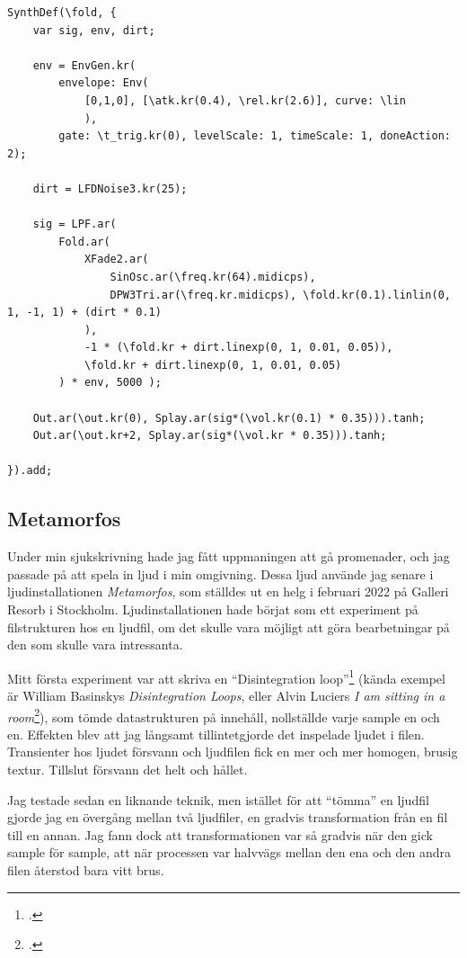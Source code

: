 \documentclass{article}
\renewcommand{\baselinestretch}{1.5}
\begin{document}
\pagebreak
\renewcommand{\baselinestretch}{1}
\begin{lstlisting}[style=SuperCollider-IDE, caption=Fold-SynthDef från K87-89]
SynthDef(\fold, {
	var sig, env, dirt;

	env = EnvGen.kr(
		envelope: Env(
			[0,1,0], [\atk.kr(0.4), \rel.kr(2.6)], curve: \lin
			), 
		gate: \t_trig.kr(0), levelScale: 1, timeScale: 1, doneAction: 2);

	dirt = LFDNoise3.kr(25);

	sig = LPF.ar( 
		Fold.ar(
			XFade2.ar(
				SinOsc.ar(\freq.kr(64).midicps), 
				DPW3Tri.ar(\freq.kr.midicps), \fold.kr(0.1).linlin(0, 1, -1, 1) + (dirt * 0.1)
			),
			-1 * (\fold.kr + dirt.linexp(0, 1, 0.01, 0.05)),
			\fold.kr + dirt.linexp(0, 1, 0.01, 0.05)
		) * env, 5000 );

	Out.ar(\out.kr(0), Splay.ar(sig*(\vol.kr(0.1) * 0.35))).tanh;
	Out.ar(\out.kr+2, Splay.ar(sig*(\vol.kr * 0.35))).tanh;

}).add;
\end{lstlisting}
\renewcommand{\baselinestretch}{1.5}

\subsection{Metamorfos}
Under min sjukskrivning hade jag fått uppmaningen att gå promenader, och jag passade på att spela in ljud i
min omgivning. Dessa ljud använde jag senare i ljudinstallationen \emph{Metamorfos}, som ställdes ut en helg i
februari 2022 på Galleri Resorb i Stockholm. Ljudinstallationen hade börjat som ett experiment på
filstrukturen hos en ljudfil, om det skulle vara möjligt att göra bearbetningar på den som skulle vara
intressanta. 

Mitt första experiment var att skriva en ``Disintegration loop''\footcite{Basinski} (kända
exempel är William Basinskys \emph{Disintegration Loops}, eller Alvin Luciers \emph{I am sitting in a
room}\footcite{Lucier}), som tömde datastrukturen på innehåll, nollställde varje sample en och en. Effekten
blev att jag långsamt tillintetgjorde det inspelade ljudet i filen. Transienter hos ljudet försvann och
ljudfilen fick en mer och mer homogen, brusig textur. Tillslut försvann det helt och hållet.

Jag testade sedan en liknande teknik, men istället för att ``tömma'' en ljudfil gjorde jag en övergång
mellan två ljudfiler, en gradvis transformation från en fil till en annan. Jag fann dock att
transformationen var så gradvis när den gick sample för sample, att när processen var halvvägs mellan den ena
och den andra filen återstod bara vitt brus. 
\end{document}
